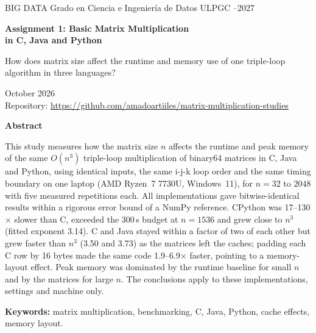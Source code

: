 \documentclass[11pt,a4paper]{article}
\newcommand{\AuthorName}{Amado Artiles Rodríguez}
\newcommand{\RepoURL}{https://github.com/amadoartiiles/matrix-multiplication-studies}
\begin{document}
\thispagestyle{empty}
\begin{tcolorbox}[enhanced,colback=accent,colframe=accent,coltext=white,arc=3pt,
  left=14pt,right=14pt,top=12pt,bottom=12pt]
{\small BIG DATA \quad\textperiodcentered\quad Grado en Ciencia e Ingeniería de Datos \quad\textperiodcentered\quad ULPGC \quad\textperiodcentered{}--2027}

\vspace{8pt}
{\LARGE\bfseries Assignment 1: Basic Matrix Multiplication\\[2pt] in C, Java and Python}

\vspace{8pt}
{\large How does matrix size affect the runtime and memory use of one triple-loop algorithm in three
languages?}
\end{tcolorbox}

\vspace{4pt}
\noindent{\large\bfseries \AuthorName}\hfill{\color{codecomment}October 2026}\\
{\small Repository: \url{\RepoURL}}

\vspace{6pt}
\begin{infobox}
{\color{accent}\bfseries Abstract}\par\vspace{3pt}
This study measures how the matrix size $n$ affects the runtime and peak memory of the same
$O(n^3)$ triple-loop multiplication of binary64 matrices in C, Java and Python, using identical
inputs, the same i-j-k loop order and the same timing boundary on one laptop (AMD Ryzen~7 7730U,
Windows~11), for $n=32$ to $2048$ with five measured repetitions each. All implementations gave
bitwise-identical results within a rigorous error bound of a NumPy reference. CPython was
17--130$\times$ slower than C, exceeded the 300\,s budget at $n=1536$ and grew close to $n^3$
(fitted exponent 3.14). C and Java stayed within a factor of two of each other but grew faster than
$n^3$ (3.50 and 3.73) as the matrices left the caches; padding each C row by 16 bytes made the same
code 1.9--6.9$\times$ faster, pointing to a memory-layout effect. Peak memory was dominated by the
runtime baseline for small $n$ and by the matrices for large $n$. The conclusions apply to these
implementations, settings and machine only.

\vspace{4pt}
{\small\textbf{Keywords:} matrix multiplication, benchmarking, C, Java, Python, cache effects,
memory layout.}
\end{infobox}
\end{document}

